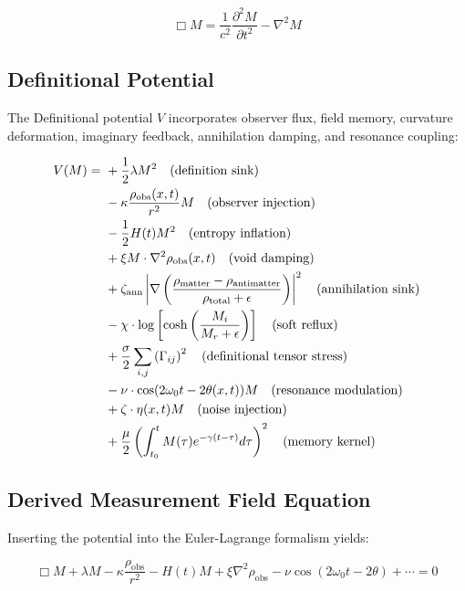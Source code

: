 \begin{equation}
\Box M = \frac{1}{c^2} \frac{\partial^2 M}{\partial t^2} - \nabla^2 M
\end{equation}

\subsection{Definitional Potential}

The Definitional potential \( V \) incorporates observer flux, field memory, curvature deformation, imaginary feedback, annihilation damping, and resonance coupling:

\begin{align}
V(M) =\ 
& + \frac{1}{2} \lambda M^2 \quad \text{(definition sink)} \notag \\
& - \kappa \frac{\rho_{\text{obs}}(x,t)}{r^2} M \quad \text{(observer injection)} \notag \\
& - \frac{1}{2} H(t) M^2 \quad \text{(entropy inflation)} \notag \\
& + \xi M \cdot \nabla^2 \rho_{\text{obs}}(x,t) \quad \text{(void damping)} \notag \\
& + \zeta_{\text{ann}} \left| \nabla \left( \frac{\rho_{\text{matter}} - \rho_{\text{antimatter}}}{\rho_{\text{total}} + \epsilon} \right) \right|^2 \quad \text{(annihilation sink)} \notag \\
& - \chi \cdot \log\left[ \cosh\left( \frac{M_i}{M_r + \epsilon} \right) \right] \quad \text{(soft reflux)} \notag \\
& + \frac{\sigma}{2} \sum_{i,j} \left( \Gamma_{ij} \right)^2 \quad \text{(definitional tensor stress)} \notag \\
& - \nu \cdot \cos(2\omega_0 t - 2\theta(x,t)) M \quad \text{(resonance modulation)} \notag \\
& + \zeta \cdot \eta(x,t) M \quad \text{(noise injection)} \notag \\
& + \frac{\mu}{2} \left( \int_{t_0}^t M(\tau) e^{-\gamma(t - \tau)} d\tau \right)^2 \quad \text{(memory kernel)}
\end{align}

\subsection{Derived Measurement Field Equation}

Inserting the potential into the Euler-Lagrange formalism yields:

\begin{equation}
\boxed{
\Box M 
+ \lambda M 
- \kappa \frac{\rho_{\text{obs}}}{r^2}
- H(t) M 
+ \xi \nabla^2 \rho_{\text{obs}}
- \nu \cos(2\omega_0 t - 2\theta) 
+ \cdots = 0
}
\end{equation}

